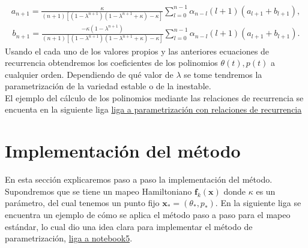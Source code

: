 \begin{eqnarray}
a_{n+1}=\frac{\kappa}{(n+1)[(1-\lambda^{n+1})(1-\lambda^{n+1}+\kappa)-\kappa]}\sum_{l=0}^{n-1}\alpha_{n-l}(l+1)(a_{l+1}+b_{l+1}),
\end{eqnarray}
\begin{eqnarray}
b_{n+1}=\frac{-\kappa(1-\lambda^{n+1})}{(n+1)[(1-\lambda^{n+1})(1-\lambda^{n+1}+\kappa)-\kappa]}\sum_{l=0}^{n-1}\alpha_{n-l}(l+1)(a_{l+1}+b_{l+1}).
\end{eqnarray}
Usando el cada uno de los valores propios y las anteriores ecuaciones de recurrencia obtendremos los coeficientes de los polinomios $\theta(t),p(t)$ a cualquier orden. Dependiendo de qué valor de $\lambda$ se tome tendremos la parametrización de la variedad estable o de la inestable.\\

El ejemplo del cálculo de los polinomios mediante las relaciones de recurrencia se encuenta en la siguiente liga \url{liga a parametrización con relaciones de recurrencia}






\section{Implementación del método}
En esta sección explicaremos paso a paso la implementación del método. Supondremos que se tiene un mapeo Hamiltoniano $\mathbf{f}_{k}(\mathbf{x})$ donde $\kappa$  es un parámetro, del cual tenemos un punto fijo $\mathbf{x}_{*}=(\theta_{*},p_{*})$. En la siguiente liga se encuentra un ejemplo de cómo se aplica el método paso a paso para el mapeo estándar, lo cual dio una idea clara para implementar el método de parametrización, \url{liga a notebook5}. 
\linebreak


